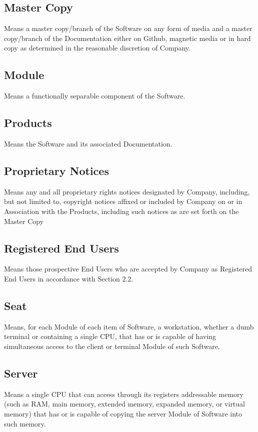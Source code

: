 \documentclass[letterpaper,10pt,openany,oneside,english]{sphinxmanual}
\begin{document}
\subsection{Master Copy}
\label{\detokenize{definitions:master-copy}}
Means a master copy/branch of the Software on any form of media and a master copy/branch of the Documentation either on Github, magnetic media or in hard copy as determined in the reasonable discretion of Company.


\subsection{Module}
\label{\detokenize{definitions:module}}
Means a functionally separable component of the Software.


\subsection{Products}
\label{\detokenize{definitions:products}}
Means the Software and its associated Documentation.


\subsection{Proprietary Notices}
\label{\detokenize{definitions:proprietary-notices}}
Means any and all proprietary rights notices designated by Company, including, but not limited to, copyright notices affixed or included by Company on or in Association  with the Products, including such notices as are set forth on the Master Copy


\subsection{Registered End Users}
\label{\detokenize{definitions:registered-end-users}}
Means those prospective End Users who are accepted by Company as Registered End Users in accordance with Section 2.2.


\subsection{Seat}
\label{\detokenize{definitions:seat}}
Means, for each Module of each item of Software, a workstation, whether a dumb terminal or containing a single CPU, that has or is capable of having simultaneous access to the client or terminal Module of such Software.


\subsection{Server}
\label{\detokenize{definitions:server}}
Means a single CPU that can access through its registers addressable memory (such as RAM, main memory, extended memory, expanded memory, or virtual memory) that has or is capable of copying the server Module of Software into such memory.
\end{document}
